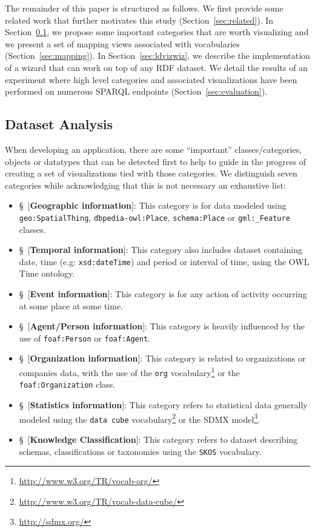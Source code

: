 The remainder  of this paper is structured as follows. We first provide some related work that further motivates this study (Section~\ref{sec:related}). In Section~\ref{sec:vizTypes}, we propose some important categories that are worth visualizing and we present a set of mapping views associated with vocabularies (Section~\ref{sec:mapping}). In Section~\ref{sec:ldvizwiz}, we describe the implementation of a wizard that can work on top of any RDF dataset. We detail the results of an experiment where high level categories and associated visualizations have been performed on numerous SPARQL endpoints (Section~\ref{sec:evaluation}). 

\subsection{Dataset Analysis}
\label{sec:vizTypes}
When developing an application, there are some ``important'' classes/categories, objects or datatypes that can be detected first to help to guide in the progress of creating a set of visualizations tied with those categories. We distinguish seven categories while acknowledging that this is not necessary an exhaustive list:
\begin{itemize}
 \item{\S~[\textbf{Geographic information}]}: This category is for data modeled using \texttt{geo:SpatialThing}, \texttt{dbpedia-owl:Place}, \texttt{schema:Place} or \texttt{gml:\_Feature} classes.
 \item{\S~[\textbf{Temporal information}]}: This category also includes dataset containing date, time (e.g: \texttt{xsd:dateTime}) and period or interval of time, using the OWL Time ontology.
 \item{\S~[\textbf{Event information}]}: This category is for any action of activity occurring at some place at some time.
 \item{\S~[\textbf{Agent/Person information}]}: This category is heavily influenced by the use of \texttt{foaf:Person} or \texttt{foaf:Agent}.
 \item{\S~[\textbf{Organization information}]}: This category is related to organizations or companies data, with the use of the \texttt{org} vocabulary\footnote{\url{http://www.w3.org/TR/vocab-org/}} or the \texttt{foaf:Organization} class.
 \item{\S~[\textbf{Statistics information}]}: This category refers to statistical data generally modeled using the \texttt{data cube} vocabulary\footnote{\url{http://www.w3.org/TR/vocab-data-cube/}} or the SDMX model\footnote{\url{http://sdmx.org/}}.
 \item{\S~[\textbf{Knowledge Classification}]}: This category refers to dataset describing schemas, classifications or taxonomies using the \texttt{SKOS} vocabulary.
\end{itemize}



